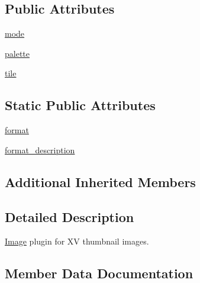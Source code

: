 \subsection*{Public Attributes}
\begin{DoxyCompactItemize}
\item 
\hyperlink{classPIL_1_1XVThumbImagePlugin_1_1XVThumbImageFile_a1cf735ea8753232de28aea82f66ef727}{mode}
\item 
\hyperlink{classPIL_1_1XVThumbImagePlugin_1_1XVThumbImageFile_a6d972353c0476fe912c9eb00ea80fd0e}{palette}
\item 
\hyperlink{classPIL_1_1XVThumbImagePlugin_1_1XVThumbImageFile_a6e3166a446830681001d92527d8d2ef7}{tile}
\end{DoxyCompactItemize}
\subsection*{Static Public Attributes}
\begin{DoxyCompactItemize}
\item 
\hyperlink{classPIL_1_1XVThumbImagePlugin_1_1XVThumbImageFile_a9a2042fcf1bef0b7e5a3f824f6c1f88a}{format}
\item 
\hyperlink{classPIL_1_1XVThumbImagePlugin_1_1XVThumbImageFile_a15a0ac8ce6e7c0e6eb845761d7858285}{format\+\_\+description}
\end{DoxyCompactItemize}
\subsection*{Additional Inherited Members}


\subsection{Detailed Description}
\hyperlink{namespacePIL_1_1Image}{Image} plugin for XV thumbnail images. 



\subsection{Member Data Documentation}
\mbox{\label{classPIL_1_1XVThumbImagePlugin_1_1XVThumbImageFile_a9a2042fcf1bef0b7e5a3f824f6c1f88a}} 
